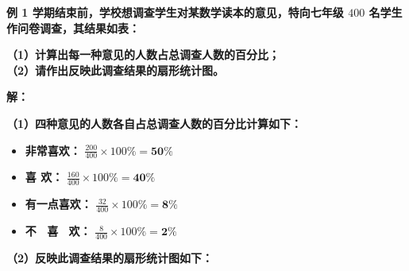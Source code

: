\documentclass[12pt, a4paper]{ctexrep}
\begin{document}
\vspace{0.6cm}

\textbf{例 1 \quad 学期结束前，学校想调查学生对某数学读本的意见，特向七年级 $400$ 名学生作问卷调查，其结果如表：}

\vspace{0.2cm}
\begin{center}
\renewcommand{\arraystretch}{1.6}
\end{center}

\vspace{0.4cm}

\textbf{（1）计算出每一种意见的人数占总调查人数的百分比；} \\
\textbf{（2）请作出反映此调查结果的扇形统计图。}

\vspace{0.4cm}
\textbf{解：}

\textbf{（1）四种意见的人数各自占总调查人数的百分比计算如下：}
\begin{itemize}
    \item \textbf{非常喜欢：} $\displaystyle \frac{200}{400} \times 100\% = \boldsymbol{50\%}$
    \vspace{0.1cm}
    \item \textbf{喜 \qquad 欢：} $\displaystyle \frac{160}{400} \times 100\% = \boldsymbol{40\%}$
    \vspace{0.1cm}
    \item \textbf{有一点喜欢：} $\displaystyle \frac{32}{400} \times 100\% = \boldsymbol{8\%}$
    \vspace{0.1cm}
    \item \textbf{不 \ 喜 \ 欢：} $\displaystyle \frac{8}{400} \times 100\% = \boldsymbol{2\%}$
\end{itemize}

\vspace{0.4cm}
\textbf{（2）反映此调查结果的扇形统计图如下：}
\end{document}
